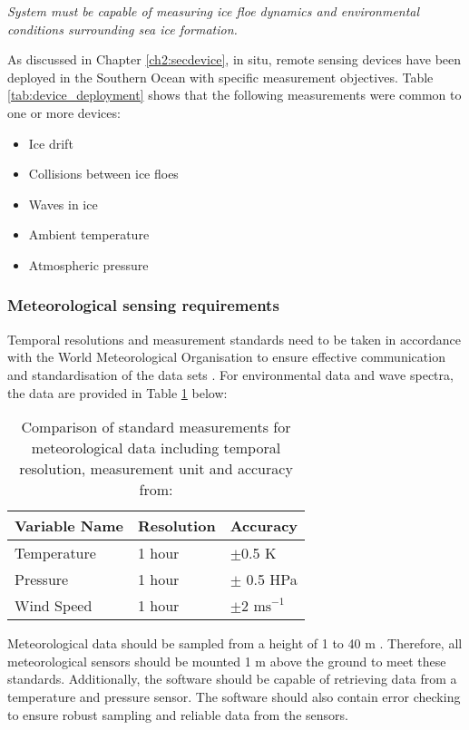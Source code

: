 \textit{System must be capable of measuring ice floe dynamics and environmental conditions surrounding sea ice formation.}

As discussed in Chapter \ref{ch2:secdevice}, in situ, remote sensing devices have been deployed in the Southern Ocean with specific measurement objectives. Table \ref{tab:device_deployment} shows that the following measurements were common to one or more devices:
\begin{itemize}
	\item Ice drift
	\item Collisions between ice floes
	\item Waves in ice
	\item Ambient temperature
	\item Atmospheric pressure
\end{itemize}

\subsubsection{Meteorological sensing requirements}

Temporal resolutions and measurement standards need to be taken in accordance with the World Meteorological Organisation to ensure effective communication and standardisation of the data sets \cite{worldmeteorologicalorganization_2010}. For environmental data and wave spectra, the data are provided in Table \ref{tab:metocean} below:

\begin{table}[H]
	\centering
	\caption{Comparison of standard measurements for meteorological data including temporal resolution, measurement unit and accuracy from: \cite{worldmeteorologicalorganization_2010}}
	\setlength{\extrarowheight}{5pt}
	\begin{tabular}{lll}
		\hline
		\textbf{Variable Name}  & \textbf{Resolution} & \textbf{Accuracy}\\
		\hline
		\hline
		Temperature & 1 hour & $\pm$0.5 K \\
		
		Pressure & 1 hour & $\pm$ 0.5 HPa \\
		
		Wind Speed & 1 hour & $\pm \text{2 ms}^{-1}$\\
		\hline
	\end{tabular}
	\label{tab:metocean}
\end{table}

Meteorological data should be sampled from a height of 1 to 40 m  \cite{worldmeteorologicalorganization_2010}. Therefore, all meteorological sensors should be mounted 1 m above the ground to meet these standards. Additionally, the software should be capable of retrieving data from a temperature and pressure sensor. The software should also contain error checking to ensure robust sampling and reliable data from the sensors. \par 

